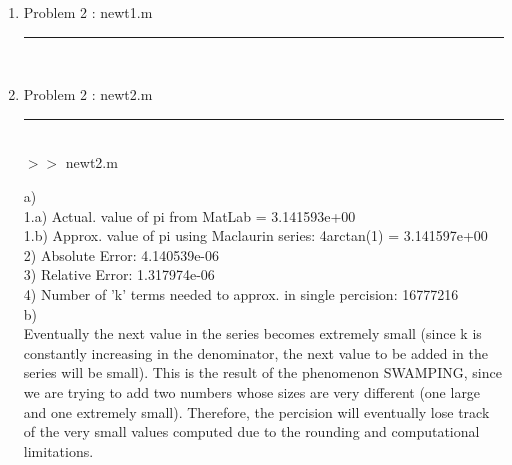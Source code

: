 \documentclass[12pt]{article}
\begin{document}
\pagebreak	
	
	\begin{enumerate}
	\item[] Problem 2 : newt1.m \noindent\rule{\textwidth}{1.0pt} \\
		
	
	\item[] Problem 2 : newt2.m \noindent\rule{\textwidth}{1.0pt} \\
		

	$>>$ newt2.m 
	\begin{framed}
a)\\
  \tabto{0.5cm}1.a) Actual. value of pi from MatLab = 3.141593e+00\\
   \tabto{0.5cm}1.b) Approx. value of pi using Maclaurin series: 4arctan(1) = 3.141597e+00\\
   \tabto{0.5cm}2) Absolute Error: 4.140539e-06\\
   \tabto{0.5cm}3) Relative Error: 1.317974e-06\\
   \tabto{0.5cm}4) Number of 'k' terms needed to approx. in single percision: 16777216\\
b)\\
   \tabto{0.5cm}Eventually the next value in the series becomes extremely small (since k is constantly increasing in the denominator, the next value to be added in the series will be small). This is the result of the phenomenon SWAMPING, since we are trying to add two numbers whose sizes are very different (one large and one extremely small). Therefore, the percision will eventually lose track of the very small values computed due to the rounding and computational limitations.	
	\end{framed}
	\end{enumerate}

	\pagebreak
\end{document}
